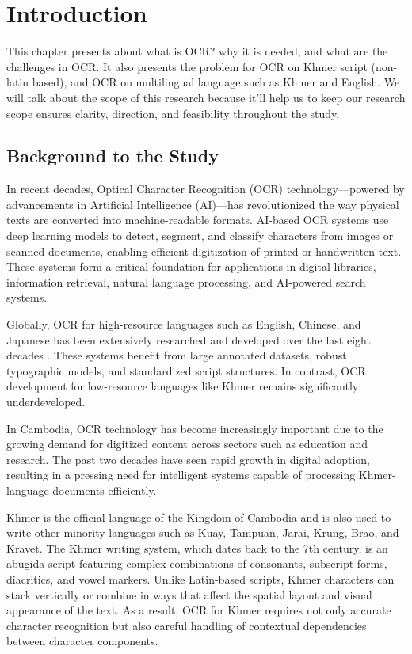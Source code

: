 \clearpage
{}
\setcounter{page}{1}

\label{ch:intro}
\chapter{Introduction}

This chapter presents about what is OCR? why it is needed, and
what are the challenges in OCR. It also presents the problem 
for OCR on Khmer script (non-latin based), and OCR on multilingual
language such as Khmer and English. We will talk about the scope
of this research because it'll help us to keep 
our research scope ensures clarity, direction, and feasibility 
throughout the study.
\section{Background to the Study}
\label{sec:background}

In recent decades, Optical Character Recognition (OCR) technology—powered by advancements in Artificial Intelligence (AI)—has revolutionized the way physical texts are converted into machine-readable formats. AI-based OCR systems use deep learning models to detect, segment, and classify characters from images or scanned documents, enabling efficient digitization of printed or handwritten text. These systems form a critical foundation for applications in digital libraries, information retrieval, natural language processing, and AI-powered search systems.

Globally, OCR for high-resource languages such as English, Chinese, and Japanese has been extensively researched and developed over the last eight decades \citep{memon2020handwritten}. These systems benefit from large annotated datasets, robust typographic models, and standardized script structures. In contrast, OCR development for low-resource languages like Khmer remains significantly underdeveloped.

In Cambodia, OCR technology has become increasingly important due to the growing demand for digitized content across sectors such as education and research. The past two decades have seen rapid growth in digital adoption, resulting in a pressing need for intelligent systems capable of processing Khmer-language documents efficiently.

Khmer is the official language of the Kingdom of Cambodia and is also used to write other minority languages such as Kuay, Tampuan, Jarai, Krung, Brao, and Kravet. The Khmer writing system, which dates back to the 7th century, is an abugida script featuring complex combinations of consonants, subscript forms, diacritics, and vowel markers. Unlike Latin-based scripts, Khmer characters can stack vertically or combine in ways that affect the spatial layout and visual appearance of the text. As a result, OCR for Khmer requires not only accurate character recognition but also careful handling of contextual dependencies between character components.

